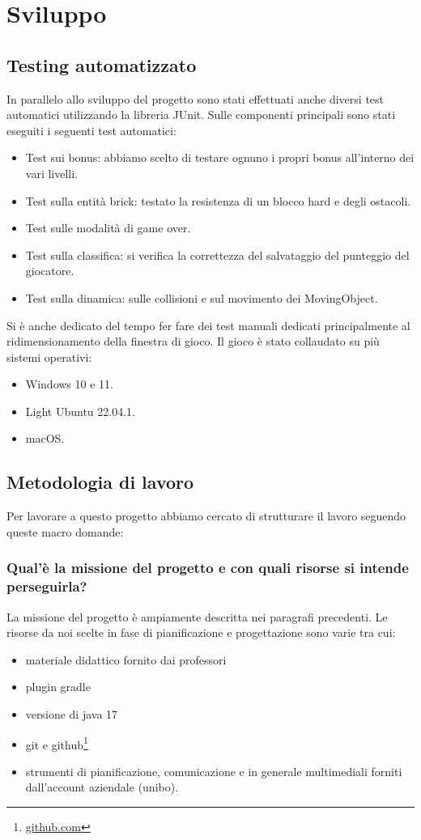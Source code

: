 \documentclass[a4paper,12pt]{report}
\begin{document}
\chapter{Sviluppo}
\section{Testing automatizzato}
In parallelo allo sviluppo del progetto sono stati effettuati anche diversi test automatici utilizzando la libreria JUnit.
Sulle componenti principali sono stati eseguiti i seguenti test automatici:
\begin{itemize}
    \item Test sui bonus: abbiamo scelto di testare ognuno i propri bonus all'interno dei vari livelli.
    \item Test sulla entità brick: testato la resistenza di un blocco hard e degli ostacoli.
    \item Test sulle modalità di game over.
    \item Test sulla classifica: si verifica la correttezza del salvataggio del punteggio del giocatore.
    \item Test sulla dinamica: sulle collisioni e sul movimento dei MovingObject.
\end{itemize}
Si è anche dedicato del tempo fer fare dei test manuali dedicati principalmente al ridimensionamento della finestra di gioco.
Il gioco è stato collaudato su più sistemi operativi:
\begin{itemize}
    \item Windows 10 e 11.
    \item Light Ubuntu 22.04.1.
    \item macOS.
\end{itemize}

\section{Metodologia di lavoro}
Per lavorare
a questo progetto abbiamo cercato di strutturare il lavoro seguendo queste macro domande:
\subsection{Qual'è la missione del progetto e con quali risorse si intende perseguirla?}
La missione del progetto è ampiamente descritta nei paragrafi precedenti.
Le risorse da noi scelte in fase di pianificazione e progettazione sono varie tra cui:
\begin{itemize}
    \item materiale didattico fornito dai professori
    \item plugin gradle
    \item versione di java 17
    \item git e github\footnote{\url{github.com}}
    \item strumenti di pianificazione, comunicazione e in generale multimediali forniti dall'account aziendale (unibo).
\end{itemize}
\end{document}
